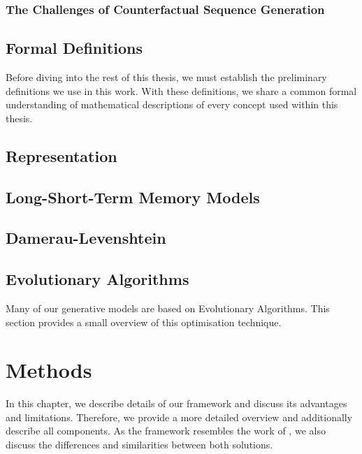 \documentclass[12pt,a4paper]{report}
\begin{document}
\subsection{The Challenges of Counterfactual Sequence Generation}



\section{Formal Definitions}
\label{sec:formulas}
Before diving into the rest of this thesis, we must establish the preliminary definitions we use in this work. With these definitions, we share a common formal understanding of mathematical descriptions of every concept used within this thesis. 


\section{Representation}
\label{sec:representation}


\section{Long-Short-Term Memory Models}
\label{sec:lstm}


\section{Damerau-Levenshtein}
\label{sec:damerau}


\section{Evolutionary Algorithms}
\label{sec:evo}
Many of our generative models are based on Evolutionary Algorithms. This section provides a small overview of this optimisation technique.  



\chapter{Methods}
\label{ch:methods}
In this chapter, we describe details of our framework and discuss its advantages and limitations. 
Therefore, we provide a more detailed overview and additionally describe all components. As the framework resembles the work of \citeauthor{hsieh_DiCE4ELInterpretingProcess_2021}, we also discuss the differences and similarities between both solutions. 
\end{document}
